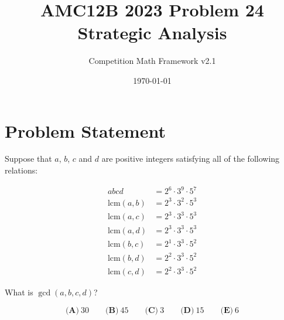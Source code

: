 \documentclass[12pt]{article}
\begin{document}
\title{AMC12B 2023 Problem 24\\Strategic Analysis}
\author{Competition Math Framework v2.1}
\date{\today}
\maketitle

\section*{Problem Statement}

Suppose that $a$, $b$, $c$ and $d$ are positive integers satisfying all of the following relations:

\begin{align*}
abcd &= 2^6 \cdot 3^9 \cdot 5^7\\
\text{lcm}(a,b) &= 2^3 \cdot 3^2 \cdot 5^3\\
\text{lcm}(a,c) &= 2^3 \cdot 3^3 \cdot 5^3\\
\text{lcm}(a,d) &= 2^3 \cdot 3^3 \cdot 5^3\\
\text{lcm}(b,c) &= 2^1 \cdot 3^3 \cdot 5^2\\
\text{lcm}(b,d) &= 2^2 \cdot 3^3 \cdot 5^2\\
\text{lcm}(c,d) &= 2^2 \cdot 3^3 \cdot 5^2
\end{align*}

What is $\gcd(a,b,c,d)$?

$$\textbf{(A)}~30\qquad\textbf{(B)}~45\qquad\textbf{(C)}~3\qquad\textbf{(D)}~15\qquad\textbf{(E)}~6$$
\end{document}
